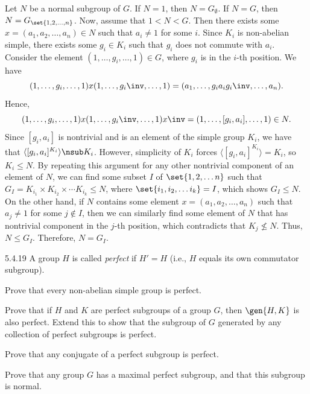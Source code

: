 \begin{sol}
    Let $N$ be a normal subgroup of $G$.
	If $N = 1$, then $N = G_\emptyset$.
	If $N = G$, then $N = G_{\set{1, 2, \ldots, n}}$.
	Now, assume that $1 < N < G$.
	Then there exists some $x = (a_1, a_2, \ldots, a_n) \in N$ such that $a_i \neq 1$ for some $i$.
	Since $K_i$ is non-abelian simple, there exists some $g_i \in K_i$ such that $g_i$ does not commute with $a_i$.
	Consider the element $(1, \ldots, g_i, \ldots, 1) \in G$, where $g_i$ is in the $i$-th position.
	We have
    \[
    	(1, \ldots, g_i, \ldots, 1) x (1, \ldots, g_i\inv, \ldots, 1) = (a_1, \ldots, g_i a_i g_i\inv, \ldots, a_n).
    \]
    Hence,
    \[
    	(1, \ldots, g_i, \ldots, 1) x (1, \ldots, g_i\inv, \ldots, 1) x\inv = (1, \ldots, [g_i, a_i], \ldots, 1) \in N.
    \]
    Since $[g_i, a_i]$ is nontrivial and is an element of the simple group $K_i$, we have that $\langle [g_i, a_i]^{K_i} \rangle \nsub K_i$.
	However, simplicity of $K_i$ forces $\langle [g_i, a_i]^{K_i} \rangle = K_i$, so $K_i \leq N$.
	By repeating this argument for any other nontrivial component of an element of $N$, we can find some subset $I$ of $\set{1, 2, \ldots n}$ such that $G_I = K_{i_1} \times K_{i_2} \times \cdots K_{i_k} \leq N$, where $\set{i_1, i_2, \ldots i_k} = I$, which shows $G_I \leq N$.
	On the other hand, if $N$ contains some element $x = (a_1, a_2, \ldots, a_n)$ such that $a_j \neq 1$ for some $j \notin I$, then we can similarly find some element of $N$ that has nontrivial component in the $j$-th position, which contradicts that $K_j \not\leq N$.
	Thus, $N \leq G_I$.
	Therefore, $N = G_I$.
\end{sol}

\begin{exercise}{5.4.19}
    A group $H$ is called \emph{perfect} if $H' = H$ (i.e., $H$ equals its own commutator subgroup).
    \begin{subexercises}
        \item Prove that every non-abelian simple group is perfect.
        \item Prove that if $H$ and $K$ are perfect subgroups of a group $G$, then $\gen{H, K}$ is also perfect.
	Extend this to show that the subgroup of $G$ generated by any collection of perfect subgroups is perfect.
        \item Prove that any conjugate of a perfect subgroup is perfect.
        \item Prove that any group $G$ has a maximal perfect subgroup, and that this subgroup is normal.
    \end{subexercises}
\end{exercise}

